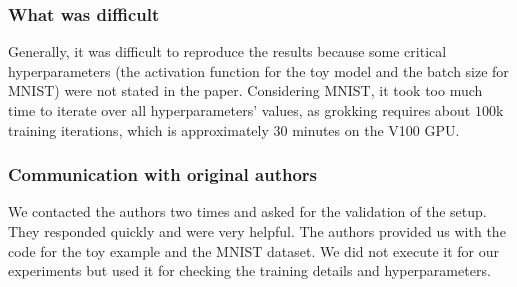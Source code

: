 \subsubsection*{What was difficult}
Generally, it was difficult to reproduce the results because some critical hyperparameters (the activation function for the toy model and the batch size for MNIST) were not stated in the paper. Considering MNIST, it took too much time to iterate over all hyperparameters' values, as grokking requires about $100$k training iterations, which is approximately $30$ minutes on the V100 GPU.

\subsubsection*{Communication with original authors}
We contacted the authors two times and asked for the validation of the setup. They responded quickly and were very helpful. The authors provided us with the code for the toy example and the MNIST dataset. We did not execute it for our experiments but used it for checking the training details and hyperparameters.
